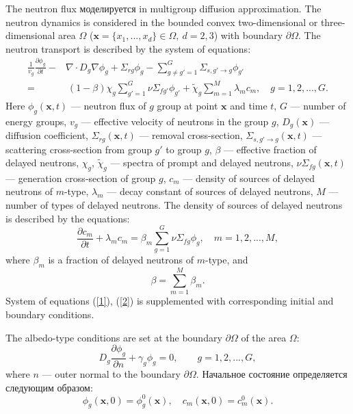 \documentclass[authoryear]{elsarticle}
\begin{document}
The neutron flux  моделируется in multigroup diffusion approximation. The neutron dynamics is considered in the bounded convex two-dimensional or three-dimensional area  $\Omega$ ($\bm x = \{x_1, ..., x_d\} \in \Omega, \ d = 2,3$) with boundary $\partial \Omega$. The neutron transport is described by the system of equations:
\begin{equation}\label{1}
\begin{split}
 \frac{1}{v_g} \frac{\partial \phi_g}{\partial t} - & \nabla \cdot D_g \nabla \phi_g + \Sigma_{rg} \phi_g 
 - \sum_{g\neq g'=1}^{G} \Sigma_{s,g'\rightarrow g} \phi_{g'} \\
 =  & \ (1-\beta) \chi_g \sum_{g'=1}^{G} \nu \Sigma_{fg'} \phi_{g'} + \widetilde{\chi}_g \sum_{m=1}^{M} \lambda_m c_m , \quad 
 g = 1,2, ..., G .
\end{split}
\end{equation} 
Here $\phi_g(\bm x,t)$ --- neutron flux of $g$ group at point $\bm x$ and time $t$,
$G$ --- number of energy groups,
$v_g$ --- effective velocity of neutrons in the group $g$,
$D_g(\bm x)$ --- diffusion coefficient, $\Sigma_{rg}(\bm x,t)$ --- removal cross-section,
$\Sigma_{s,g'\rightarrow g}(\bm x,t)$ --- scattering cross-section from group $g'$ to group $g$,
$\beta$ --- effective fraction of delayed neutrons, $\chi_g$, $\widetilde{\chi}_g$  --- spectra of prompt and delayed neutrons, 
$\nu\Sigma_{fg}(\bm x,t)$ --- generation cross-section of group $g$,
$c_m$ --- density of sources of delayed neutrons of $m$-type,  $\lambda_m$ --- decay constant of sources of delayed neutrons,
$M$ --- number of types of delayed neutrons.
The density of sources of delayed neutrons is described by the equations:
\begin{equation}\label{2}
 \frac{\partial c_m}{\partial t} + \lambda_m c_m = \beta_m \sum_{g=1}^{G} \nu \Sigma_{fg} \phi_g ,
 \quad m = 1,2, ..., M , 
\end{equation} 
where $\beta_m$ is a fraction of delayed neutrons of $m$-type, and
\[
 \beta = \sum_{m=1}^{M} \beta_m .
\] 
System of equations (\ref{1}), (\ref{2}) is supplemented with corresponding initial and boundary conditions.

The albedo-type conditions are set at the boundary $\partial \Omega$ of the area $\Omega$:
\begin{equation}\label{3}
 D_g\frac{\partial \phi_g}{\partial n} + \gamma_g \phi_g = 0, \quad 
 \quad g = 1,2, ..., G ,
\end{equation}
where $n$ --- outer normal to the boundary $\partial \Omega$.
Начальное состояние определяется следующим образом:
\begin{equation}\label{4}
 \phi_g(\bm x,0) = \phi_g^0(\bm x), 
 \quad c_m(\bm x,0) = c_m^0(\bm x) . 
\end{equation} 
\end{document}
